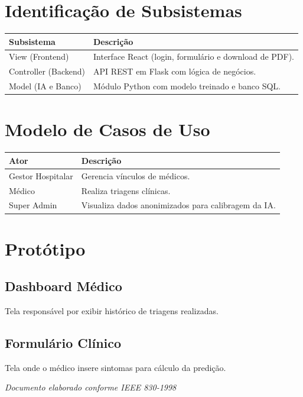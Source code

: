 \documentclass[12pt,a4paper]{article}
\begin{document}
\section{Identificação de Subsistemas}

\begin{longtable}{|p{4cm}|p{9cm}|}
\hline
\textbf{Subsistema} & \textbf{Descrição} \\
\hline
View (Frontend) & Interface React (login, formulário e download de PDF). \\
\hline
Controller (Backend) & API REST em Flask com lógica de negócios. \\
\hline
Model (IA e Banco) & Módulo Python com modelo treinado e banco SQL. \\
\hline
\end{longtable}

\section{Modelo de Casos de Uso}

\begin{longtable}{|p{4cm}|p{9cm}|}
\hline
\textbf{Ator} & \textbf{Descrição} \\
\hline
Gestor Hospitalar & Gerencia vínculos de médicos. \\
\hline
Médico & Realiza triagens clínicas. \\
\hline
Super Admin & Visualiza dados anonimizados para calibragem da IA. \\
\hline
\end{longtable}

\section{Protótipo}

\subsection{Dashboard Médico}

Tela responsável por exibir histórico de triagens realizadas.

\subsection{Formulário Clínico}

Tela onde o médico insere sintomas para cálculo da predição.

\vfill
\begin{center}
\textit{Documento elaborado conforme IEEE 830-1998}
\end{center}
\end{document}

